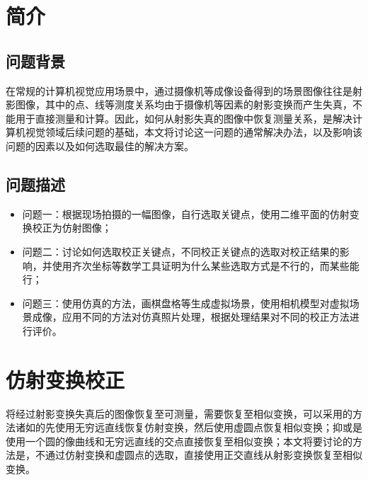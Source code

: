 \documentclass[11pt]{article}
\begin{document}
\newpage

\setcounter{tocdepth}{3}
\tableofcontents
\newpage

\setcounter{page}{1}
\section{简介}
\subsection{问题背景}
在常规的计算机视觉应用场景中，通过摄像机等成像设备得到的场景图像往往是射影图像，其中的点、线等测度关系均由于摄像机等因素的射影变换而产生失真，不能用于直接测量和计算。因此，如何从射影失真的图像中恢复测量关系，是解决计算机视觉领域后续问题的基础，本文将讨论这一问题的通常解决办法，以及影响该问题的因素以及如何选取最佳的解决方案。
\subsection{问题描述}
\begin{itemize}
  \item 问题一：根据现场拍摄的一幅图像，自行选取关键点，使用二维平面的仿射变换校正为仿射图像；
  \item 问题二：讨论如何选取校正关键点，不同校正关键点的选取对校正结果的影响，并使用齐次坐标等数学工具证明为什么某些选取方式是不行的，而某些能行；
  \item 问题三：使用仿真的方法，画棋盘格等生成虚拟场景，使用相机模型对虚拟场景成像，应用不同的方法对仿真照片处理，根据处理结果对不同的校正方法进行评价。
\end{itemize}

\section{仿射变换校正}
将经过射影变换失真后的图像恢复至可测量，需要恢复至相似变换，可以采用的方法诸如的先使用无穷远直线恢复仿射变换，然后使用虚圆点恢复相似变换；抑或是使用一个圆的像曲线和无穷远直线的交点直接恢复至相似变换；本文将要讨论的方法是，不通过仿射变换和虚圆点的选取，直接使用正交直线从射影变换恢复至相似变换。
\end{document}
